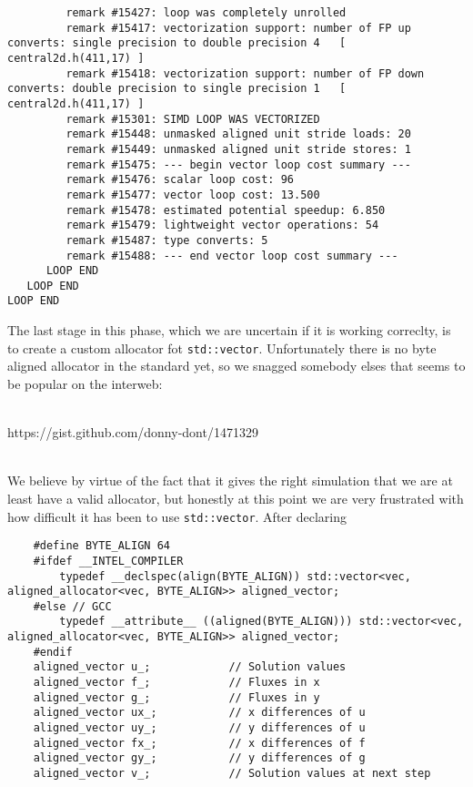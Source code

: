 {\begin{lstlisting}
         remark #15427: loop was completely unrolled
         remark #15417: vectorization support: number of FP up converts: single precision to double precision 4   [ central2d.h(411,17) ]
         remark #15418: vectorization support: number of FP down converts: double precision to single precision 1   [ central2d.h(411,17) ]
         remark #15301: SIMD LOOP WAS VECTORIZED
         remark #15448: unmasked aligned unit stride loads: 20 
         remark #15449: unmasked aligned unit stride stores: 1 
         remark #15475: --- begin vector loop cost summary ---
         remark #15476: scalar loop cost: 96 
         remark #15477: vector loop cost: 13.500 
         remark #15478: estimated potential speedup: 6.850 
         remark #15479: lightweight vector operations: 54 
         remark #15487: type converts: 5 
         remark #15488: --- end vector loop cost summary ---
      LOOP END
   LOOP END
LOOP END
\end{lstlisting}
}

The last stage in this phase, which we are uncertain if it is working correclty, is to create a custom allocator fot \texttt{std::vector}.  Unfortunately there is no byte aligned allocator in the standard yet, so we snagged somebody elses that seems to be popular on the interweb:\\\\ \centerline{https://gist.github.com/donny-dont/1471329}\\

We believe by virtue of the fact that it gives the right simulation that we are at least have a valid allocator, but honestly at this point we are very frustrated with how difficult it has been to use \texttt{std::vector}.  After declaring

{\tiny
\begin{lstlisting}
    #define BYTE_ALIGN 64
    #ifdef __INTEL_COMPILER
        typedef __declspec(align(BYTE_ALIGN)) std::vector<vec, aligned_allocator<vec, BYTE_ALIGN>> aligned_vector;
    #else // GCC
        typedef __attribute__ ((aligned(BYTE_ALIGN))) std::vector<vec, aligned_allocator<vec, BYTE_ALIGN>> aligned_vector;
    #endif
    aligned_vector u_;            // Solution values
    aligned_vector f_;            // Fluxes in x
    aligned_vector g_;            // Fluxes in y
    aligned_vector ux_;           // x differences of u
    aligned_vector uy_;           // y differences of u
    aligned_vector fx_;           // x differences of f
    aligned_vector gy_;           // y differences of g
    aligned_vector v_;            // Solution values at next step   
\end{lstlisting}
}

